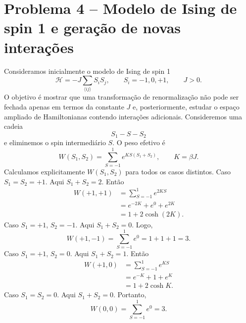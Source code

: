 \documentclass[12pt,a4paper]{article}
\begin{document}
\section*{Problema 4 -- Modelo de Ising de spin 1 e geração de novas interações}
%
Consideramos inicialmente o modelo de Ising de spin 1
%
\begin{equation}
    \mathcal H
    =
    -J\sum_{\langle ij\rangle}S_iS_j,
    \qquad
    S_i=-1,0,+1,
    \qquad
    J>0.
    \label{eq:H_spin1_initial}
\end{equation}
%
O objetivo é mostrar que uma transformação de renormalização não pode
ser fechada apenas em termos da constante \(J\) e, posteriormente,
estudar o espaço ampliado de Hamiltonianas contendo interações adicionais. Consideremos uma cadeia
%
\begin{equation}
    S_1-S-S_2
\end{equation}
%
e eliminemos o spin intermediário \(S\). O peso efetivo é
%
\begin{equation}
    W(S_1,S_2)
    =
    \sum_{S=-1}^{1}
    e^{K S(S_1+S_2)},
    \qquad
    K=\beta J.
    \label{eq:Wspin1}
\end{equation}
%
Calculamos explicitamente \(W(S_1,S_2)\) para todos os casos distintos. Caso \(S_1=S_2=+1\).
%
Aqui \(S_1+S_2=2\). Então
%
\begin{align}
    W(+1,+1)
    &=
    \sum_{S=-1}^{1}
    e^{2K S}
    \nonumber\\[4pt]
    &=
    e^{-2K}
    +
    e^{0}
    +
    e^{2K}
    \nonumber\\[4pt]
    &=
    1
    +
    2\cosh(2K).
    \label{eq:W++_p4}
\end{align}
%
Caso \(S_1=+1\), \(S_2=-1\). Aqui \(S_1+S_2=0\). Logo,
%
\begin{equation}
    W(+1,-1)
    =
    \sum_{S=-1}^{1}
    e^{0}
    =
    1+1+1
    =
    3.
    \label{eq:W+-_p4}
\end{equation}
%
Caso \(S_1=+1\), \(S_2=0\). Aqui \(S_1+S_2=1\). Então
%
\begin{align}
    W(+1,0)
    &=
    \sum_{S=-1}^{1}
    e^{K S}
    \nonumber\\[4pt]
    &=
    e^{-K}
    +
    1
    +
    e^{K}
    \nonumber\\[4pt]
    &=
    1
    +
    2\cosh K.
    \label{eq:W+0_p4}
\end{align}
%
Caso \(S_1=S_2=0\). Aqui \(S_1+S_2=0\). Portanto,
%
\begin{equation}
    W(0,0)
    =
    \sum_{S=-1}^{1}
    e^{0}
    =
    3.
    \label{eq:W00_p4}
\end{equation}
\end{document}
